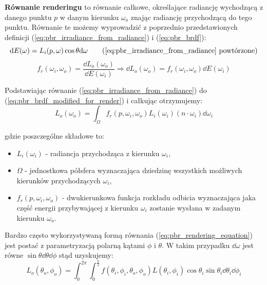 \documentclass[../main.tex]{subfiles}
\begin{document}
\textbf{Równanie renderingu} to równanie całkowe, określające radiancję wychodzącą z danego punktu $p$ w danym kierunku $\omega_o$ znając radiancję przychodzącą do tego punktu. Równanie te możemy wyprowadzić z poprzednio przedstawionych definicji  (\ref{eq:pbr_irradiance_from_radiance}) i (\ref{eq:pbr_brdf}):
\begin{equation*}
\dd E(\omega) = L_i(p, \omega) \cos\theta \dd\omega
\tag{\ref{eq:pbr_irradiance_from_radiance} powtórzone}
\end{equation*}
\begin{equation}
f_r(\omega_i, \omega_o) = \frac{
    \dd L_{o}(\omega_o)
}{
    \dd E(\omega_i)
} \Rightarrow 
\dd L_{o}(\omega_o) =  f_r(\omega_i, \omega_o) \dd E(\omega_i)
\label{eq:pbr_brdf_modified_for_render}
\end{equation}

Podstawiając równanie (\ref{eq:pbr_irradiance_from_radiance}) do (\ref{eq:pbr_brdf_modified_for_render}) i całkując otrzymujemy:
\begin{equation}
  L_{o}(\omega_o) =
  \int_{\Omega} {
    f_r(p, \omega_i, \omega_o)
    L_i(\omega_i)
    (n \cdot \omega_i)
    \dd{\omega_i}
  }
\label{eq:pbr_rendering_equation}
\end{equation}

\noindent gdzie poszczególne składowe to:

\begin{itemize}

  \item $L_i(\omega_i)$ - radiancja przychodząca z kierunku $\omega_i$,

  \item $\Omega$ - jednostkowa półsfera wyznaczająca dziedzinę wszystkich
    możliwych kierunków przychodzących $\omega_i$,

  \item $f_{r}(p, \omega_i, \omega_o)$ - dwukierunkowa funkcja rozkładu odbicia wyznaczająca jaka część energii przybywającej z kierunku $\omega_i$ zostanie wysłana w zadanym kierunku $\omega_o$.

\end{itemize}

Bardzo często wykorzystywaną formą równania (\ref{eq:pbr_rendering_equation}) jest postać z parametryzacją polarną kątami $\phi$ i $\theta$. W takim przypadku $\dd \omega$ jest równe $\sin\theta \dd\theta \dd\phi$ \cite{wolfram_solidangle} stąd uzyskujemy:
\begin{equation}
L_{o}(\theta_o, \phi_o) = \int_{0}^{2\pi} \int_{0}^{\frac{\pi}{2}} {
	f(\theta_i, \phi_i, \theta_o, \phi_o)L(\theta_i, \phi_i) \cos\theta_i \sin\theta_i
} \dd\theta_i \dd\phi_i
\label{eq:pbr_rendering_equation_angles}
\end{equation}
\end{document}
